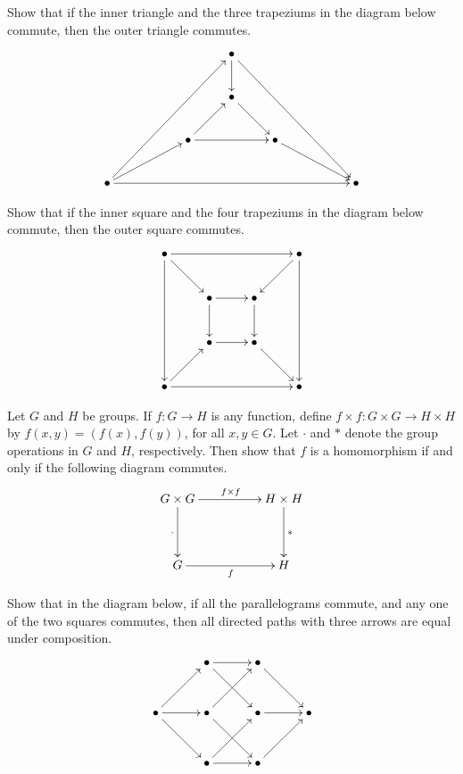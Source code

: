 \begin{Exercise}
Show that if the inner triangle and the three trapeziums in the diagram below commute, then the outer triangle commutes.
\begin{equation*}
\xymatrix{
&&& \bullet \ar[d] \ar[rrrddd] &&& \\
&&& \bullet \ar[rd] &&& \\
&& \bullet \ar[ur] \ar[rr] && \bullet \ar[rrd] && \\
\bullet \ar[rrruuu] \ar[rru] \ar[rrrrrr] &&&&&& \bullet
}
\end{equation*}
\end{Exercise}

\begin{Exercise}
Show that if the inner square and the four trapeziums in the diagram below commute, then the outer square commutes.
\begin{equation*}
\xymatrix@=2.5em{
\bullet \ar[ddd] \ar[rd] \ar[rrr] &&& \bullet \ar[ld] \ar[ddd] \\
& \bullet \ar[d] \ar[r] & \bullet \ar[d] & \\
& \bullet \ar[r] & \bullet \ar[rd] & \\
\bullet \ar[ru] \ar[rrr] &&& \bullet
}
\end{equation*}
\end{Exercise}

\begin{Exercise}
Let $G$ and $H$ be groups. If $f \colon G \to H$ is any function, define $f \times f \colon G \times G \to H \times H$ by $f(x, y) = (f(x), f(y))$, for all $x, y \in G$. Let $\cdot$ and $*$ denote the group operations in $G$ and $H$, respectively. Then show that $f$ is a homomorphism if and only if the following diagram commutes.
\begin{equation*}
\xymatrix@C=5em@R=4em{
G \times G \ar[r]^{f \times f} \ar[d]_\cdot & H \times H \ar[d]^{*} \\
G \ar[r]_f & H
}
\end{equation*}
\end{Exercise}

\begin{Exercise}
Show that in the diagram below, if all the parallelograms commute, and any one of the two squares commutes, then all directed paths with three arrows are equal under composition.
\begin{equation*}
\xymatrix@=3em{
& \bullet \ar[r] \ar[rd] & \bullet \ar[rd] & \\
\bullet \ar[r] \ar[rd] \ar[ru] & \bullet \ar[rd] \ar[ru] & \bullet \ar[r] & \bullet \\
& \bullet \ar[r] \ar[ru] & \bullet \ar[ru] &
}
\end{equation*}
\end{Exercise}

